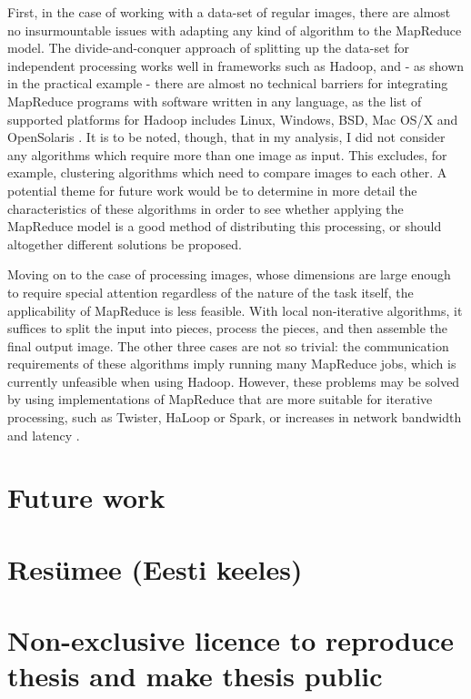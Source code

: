 \documentclass [12pt,a4paper]{report}
\begin{document}
First, in the case of working with a data-set of regular images, there are almost no insurmountable issues with adapting any kind of algorithm to the MapReduce model. The divide-and-conquer approach of splitting up the data-set for independent processing works well in frameworks such as Hadoop, and - as shown in the practical example - there are almost no technical barriers for integrating MapReduce programs with software written in any language, as the list of supported platforms for Hadoop includes Linux, Windows, BSD, Mac OS/X and OpenSolaris \cite{hadoopfaq}. It is to be noted, though, that in my analysis, I did not consider any algorithms which require more than one image as input. This excludes, for example, clustering algorithms which need to compare images to each other. A potential theme for future work would be to determine in more detail the characteristics of these algorithms in order to see whether applying the MapReduce model is a good method of distributing this processing, or should altogether different solutions be proposed.

Moving on to the case of processing images, whose dimensions are large enough to require special attention regardless of the nature of the task itself, the applicability of MapReduce is less feasible. With local non-iterative algorithms, it suffices to split the input into pieces, process the pieces, and then assemble the final output image. The other three cases are not so trivial: the communication requirements of these algorithms imply running many MapReduce jobs, which is currently unfeasible when using Hadoop. However, these problems may be solved by using implementations of MapReduce that are more suitable for iterative processing, such as Twister, HaLoop or Spark, or increases in network bandwidth and latency \cite{ekanayake2010twister,bu2010haloop,zaharia2010spark}. 

\chapter{Future work}

\chapter*{Resümee (Eesti keeles)}

\chapter*{Non-exclusive licence to reproduce thesis and make thesis public}
\end{document}

